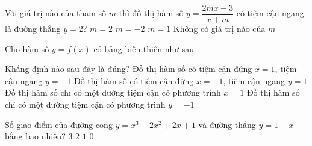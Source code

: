 \begin{ex}%
Với giá trị nào của tham số $m$ thì đồ thị hàm số $y=\dfrac{2mx-3}{x+m}$ có tiệm cận ngang là đường thẳng $y=2$?
\choice
{$m=2$}
{$m=-2$}
{\True $m=1$}
{Không có giá trị nào của $m$}
\end{ex}
\begin{ex}%
Cho hàm số $y=f(x)$ có bảng biến thiên như sau
\begin{center}
\end{center}
Khẳng định nào sau đây là đúng?
\choice
{\True Đồ thị hàm số có tiệm cận đứng $x=1$, tiệm cận ngang $y=-1$}
{Đồ thị hàm số có tiệm cận đứng $x=-1$, tiệm cận ngang $y=1$}
{Đồ thị hàm số chỉ có một đường tiệm cận có phương trình $x=1$}
{Đồ thị hàm số chỉ có một đường tiệm cận có phương trình $y=-1$}

\end{ex}
\begin{ex}%
Số giao điểm của đường cong $y=x^3-2x^2+2x+1$ và đường thẳng $y=1-x$ bằng bao nhiêu?
\choice
{$3$}
{$2$}
{\True $1$}
{$0$}
\end{ex}
